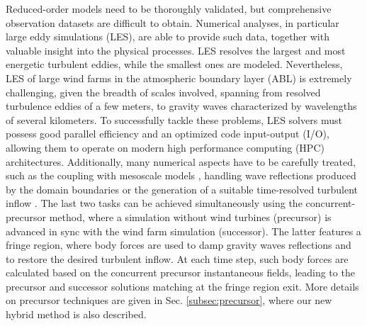 \documentclass[journal abbreviation, manuscript]{copernicus}
\begin{document}
Reduced-order models need to be thoroughly validated, but comprehensive observation datasets are difficult to obtain. Numerical analyses, in particular large eddy simulations (LES), are able to provide such data, together with valuable insight into the physical processes. LES resolves the largest and most energetic turbulent eddies, while the smallest ones are modeled. Nevertheless, LES of large wind farms in the atmospheric boundary layer (ABL) is extremely challenging, given the breadth of scales involved, spanning from resolved turbulence eddies of a few meters, to gravity waves characterized by wavelengths of several kilometers. To successfully tackle these problems, LES solvers must possess good parallel efficiency and an optimized code input-output (I/O), allowing them to operate on modern high performance computing (HPC) architectures. Additionally, many numerical aspects have to be carefully treated, such as the coupling with mesoscale models \citep{HauptEtAl2023}, handling wave reflections produced by the domain boundaries  or the generation of a suitable time-resolved turbulent inflow \citep{2022a_LanzilaoMeyers}. The last two tasks can be achieved simultaneously using the concurrent-precursor method, where a simulation without wind turbines (precursor) is advanced in sync with the wind farm simulation (successor). The latter features a fringe region, where body forces are used to damp gravity waves reflections and to restore the desired turbulent inflow. At each time step, such body forces are calculated based on the concurrent precursor instantaneous fields, leading to the precursor and successor solutions matching at the fringe region exit. More details on precursor techniques are given in Sec. \ref{subsec:precursor}, where our new hybrid method is also described. \\
\end{document}
